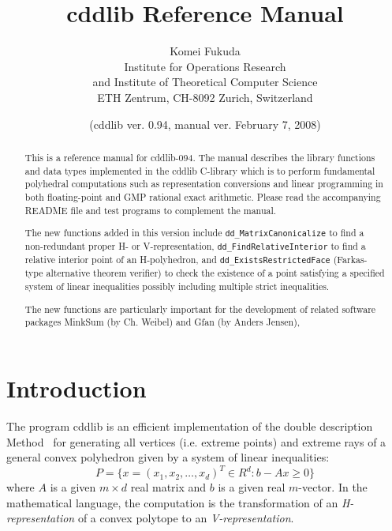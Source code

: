 \documentclass[11pt]{article}
\newcommand {\0} {{\bf 0}}
\begin{document}
\title{cddlib Reference Manual}
\author{Komei Fukuda\\
Institute for Operations Research\\
and Institute of Theoretical Computer Science\\
ETH Zentrum, CH-8092 Zurich, Switzerland\\
}
\date{ (cddlib ver. 0.94, manual ver. February 7, 2008)}

\maketitle

\tableofcontents

\begin{abstract}
This is a reference manual for cddlib-094.  
The manual describes the library functions and data types implemented 
in the cddlib C-library which is to perform fundamental polyhedral 
computations such as representation conversions and linear programming
in both floating-point and GMP rational exact arithmetic.
Please read the accompanying README file and test programs to 
complement the manual.

The new functions added in this version include {\tt dd\_MatrixCanonicalize}
to find a non-redundant proper H- or V-representation,
{\tt dd\_FindRelativeInterior} to find a relative interior point
of an H-polyhedron, and  {\tt dd\_ExistsRestrictedFace} (Farkas-type 
alternative theorem verifier)
to check the existence of a point satisfying a specified system
of linear inequalities possibly including multiple strict inequalities.

The new functions are particularly important for the development of
related software packages MinkSum (by Ch. Weibel) and Gfan
(by Anders Jensen),

\end{abstract}

\section{Introduction} \label{INTRODUCTION}

The program  cddlib  is an efficient implementation \cite{fp-ddmr-96}  of 
the double description Method~\cite{mrtt-ddm-53}
for generating  all vertices (i.e. extreme points)
and extreme rays of a general 
convex polyhedron given by 
a system of linear inequalities:
\[
   P = \{ x=(x_1, x_2, \ldots, x_d)^T \in R^{d}:  b - A  x  \ge 0 \}
\]
where $A$ is a given $m \times d$ real matrix and 
$b$ is a given real $m$-vector.   In the mathematical
language, the computation is the transformation
of an {\em H-representation\/} of a convex polytope
to an {\em V-representation}.  
\end{document}
